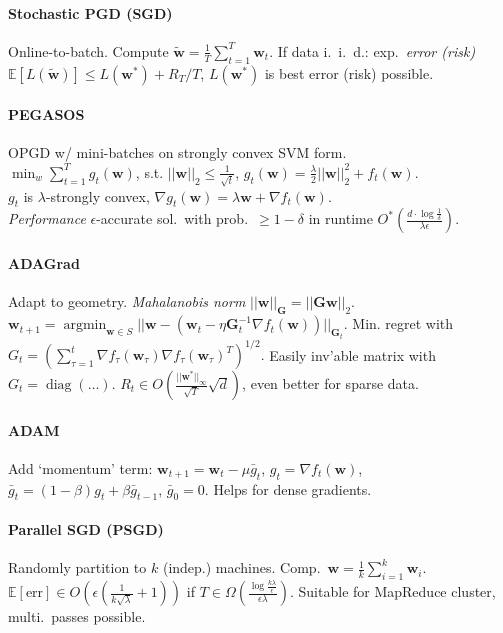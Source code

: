 \documentclass[9pt]{scrartcl}
\DeclareMathOperator{\diag}{diag}
\DeclareMathOperator{\argmin}{argmin}
\newcommand{\eps}{\epsilon}
\newcommand{\E}{\mathbb{E}}
\begin{document}
\begin{twocolumn}
\paragraph{Stochastic PGD (SGD)}
Online-to-batch. Compute $\tilde{\bm w} = \frac{1}{T}\sum_{t=1}^{T} \bm w_t$.
If data i.\ i.\ d.: exp.\ \emph{error (risk)} $\E[L(\tilde{\bm w})] \leq L(\bm w^*) + R_T/T$, $L(\bm w^*)$ is best error (risk) possible.

\paragraph{PEGASOS}
OPGD w/ mini-batches on strongly convex SVM form. \\
$\min_w \sum_{t=1}^{T} g_t(\bm w)$, s.t. $||\bm w||_2 \leq \frac{1}{\sqrt t}$, $g_t(\bm w) = \frac{\lambda}{2}||\bm w||_2^2 + f_t(\bm w)$. \\
$g_t$ is $\lambda$-strongly convex, $\nabla g_t(\bm w) = \lambda \bm w + \nabla f_t(\bm w)$. \\
\emph{Performance} $\eps$-accurate sol.\ with prob.\ $\geq 1-\delta$ in runtime $O^*(\frac{d\cdot\log\frac{1}{\delta}}{\lambda\eps}).$

\paragraph{ADAGrad}
Adapt to geometry.
\emph{Mahalanobis norm} $||\bm w||_{\bm G} = ||\bm G\bm w||_2$. \\
$\bm w_{t+1}=\argmin_{\bm w\in S}||\bm w - (\bm w_t - \eta \bm G_t^{-1}\nabla f_t(\bm w))||_{\bm G_t}$.
Min. regret with $G_t = (\sum_{\tau = 1}^{t} \nabla f_\tau(\bm w_\tau)\nabla f_\tau(\bm w_\tau)^T)^{1/2}.$
Easily inv'able matrix with $G_t = \diag(\dots).$
$R_t \in O(\frac{||\bm w^*||_\infty}{\sqrt T}\sqrt d)$, even better for sparse data.

\paragraph{ADAM}
Add `momentum' term: $\bm w_{t+1} = \bm w_t - \mu\bar g_t$, $g_t = \nabla f_t(\bm w)$, $\bar g_t = (1-\beta)g_t + \beta \bar g_{t-1}$, $\bar g_0 = 0$.
Helps for dense gradients.

\paragraph{Parallel SGD (PSGD)}
Randomly partition to $k$ (indep.) machines. Comp.\ $\bm w = \frac{1}{k}\sum_{i=1}^k \bm w_i$.
$\E[\text{err}] \in O(\eps(\frac{1}{k\sqrt\lambda}+1))$ if $T \in \Omega(\frac{\log \frac{k\lambda}{\eps}}{\eps\lambda})$.
Suitable for MapReduce cluster, multi.\ passes possible.


\end{twocolumn}
\end{document}
